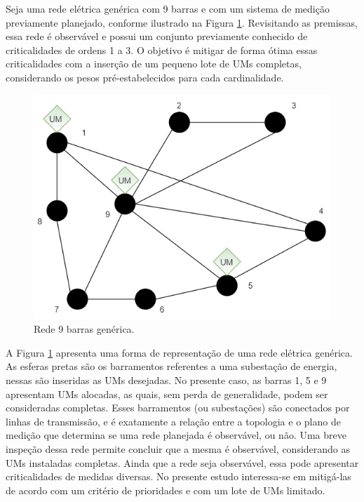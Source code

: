 \documentclass[12pt]{article}
\begin{document}
	Seja uma rede elétrica genérica com 9 barras e com um sistema de medição previamente planejado, conforme ilustrado na Figura \ref{fig3}. Revisitando as premissas, essa rede é observável e possui um conjunto previamente conhecido de criticalidades de ordens 1 a 3. O objetivo é mitigar de forma ótima essas criticalidades com a inserção de um pequeno lote de UMs completas, considerando os pesos pré-estabelecidos para cada cardinalidade.
	
	\begin{figure}[H]
		\centering 
		\includegraphics[scale=0.8]{figuras/Rede9_gen.jpg}
		\caption{Rede 9 barras genérica.}
		\label{fig3} %
	\end{figure}

	A Figura \ref{fig3} apresenta uma forma de representação de uma rede elétrica genérica. As esferas pretas são os barramentos referentes a uma subestação de energia, nessas são inseridas as UMs desejadas. No presente caso, as barras 1, 5 e 9 apresentam UMs alocadas, as quais, sem perda de generalidade, podem ser consideradas completas. Esses barramentos (ou subestações) são conectados por linhas de transmissão, e é exatamente a relação entre a topologia e o plano de medição que determina se uma rede planejada é observável, ou não. Uma breve inspeção dessa rede permite concluir que a mesma é observável, considerando as UMs instaladas completas. Ainda que a rede seja observável, essa pode apresentar criticalidades de medidas diversas. No presente estudo interessa-se em mitigá-las de acordo com um critério de prioridades e com um lote de UMs limitado.
	
\end{document}
